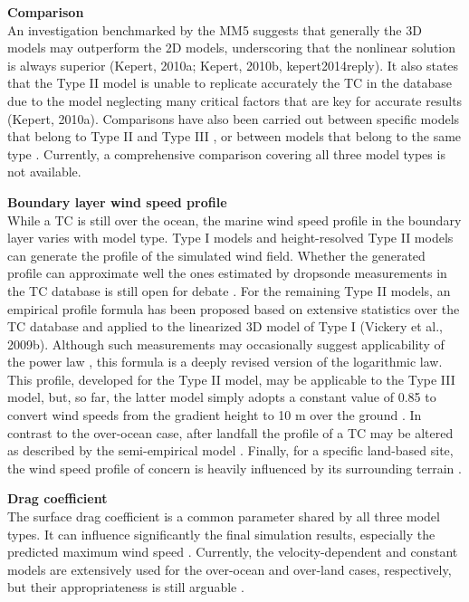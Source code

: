 \noindent\textbf{Comparison } \\An investigation benchmarked by the MM5 \citep{liu1997multiscale} suggests that generally the 3D models may outperform the 2D models, underscoring that the nonlinear solution is always superior (Kepert, 2010a; Kepert, 2010b, kepert2014reply). It also states that the Type II model is unable to replicate accurately the TC in the database due to the model neglecting many critical factors that are key for accurate results (Kepert, 2010a). Comparisons have also been carried out between specific models that belong to Type II and Type III \citep{smith2008critique}, or between models that belong to the same type \citep{snaiki2017linear, wills2000review}. Currently, a comprehensive comparison covering all three model types is not available. 
\newline

\noindent\textbf{Boundary layer wind speed profile} \\While a TC is still over the ocean, the marine wind speed profile in the boundary layer varies with model type. Type I models and height-resolved Type II models can generate the profile of the simulated wind field. Whether the generated profile can approximate well the ones estimated by dropsonde measurements in the TC database is still open for debate \citep{kepert2001dynamicsa, kepert2011choosing, kepert2013how, montgomery2014comments, smith1968surface}. For the remaining Type II models, an empirical profile formula has been proposed based on extensive statistics over the TC database and applied to the linearized 3D model of Type I (Vickery et al., 2009b). Although such measurements may occasionally suggest applicability of the power law \citep{song2016characteristics}, this formula is a deeply revised version of the logarithmic law. This profile, developed for the Type II model, may be applicable to the Type III model, but, so far, the latter model simply adopts a constant value of 0.85 to convert wind speeds from the gradient height to 10 m over the ground \citep{chavas2015model}. In contrast to the over-ocean case, after landfall the profile of a TC may be altered as described by the semi-empirical model \citep{snaiki2018semiempirical}. Finally, for a specific land-based site, the wind speed profile of concern is heavily influenced by its surrounding terrain \citep{huang2013prediction}.
\newline

\noindent\textbf{Drag coefficient} \\The surface drag coefficient is a common parameter shared by all three model types. It can influence significantly the final simulation results, especially the predicted maximum wind speed \citep{li2015observations, powell2003reduced}. Currently, the velocity-dependent and constant models are extensively used for the over-ocean and over-land cases, respectively, but their appropriateness is still arguable \citep{smith2014sensitivity}. 
\newline

